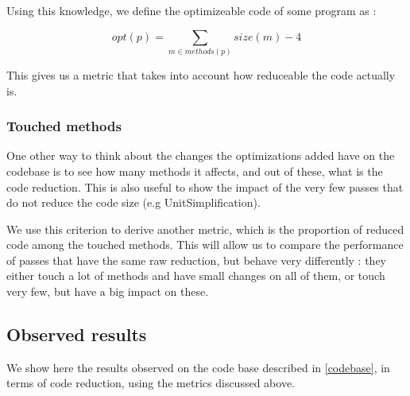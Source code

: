 \documentclass[12pt,a4paper]{article}
\newcommand{\scala}[1]{\textsf{#1}}
\begin{document}
Using this knowledge, we define the optimizeable code of some program as :

$$ opt(p) = \sum\limits_{m \in methods(p)} size(m) - 4 $$

This gives us a metric that takes into account how reduceable the code actually is.

\subsubsection*{Touched methods}

One other way to think about the changes the optimizations added have on the codebase is to see how many methods it affects, and out of these, what is the code reduction. This is also useful to show the impact of the very few passes that do not reduce the code size (e.g \scala{UnitSimplification}).

We use this criterion to derive another metric, which is the proportion of reduced code among the touched methods. This will allow us to compare the performance of passes that have the same raw reduction, but behave very differently : they either touch a lot of methods and have small changes on all of them, or touch very few, but have a big impact on these.


\subsection{Observed results}

We show here the results observed on the code base described in \ref{codebase}, in terms of code reduction, using the metrics discussed above.
\end{document}
